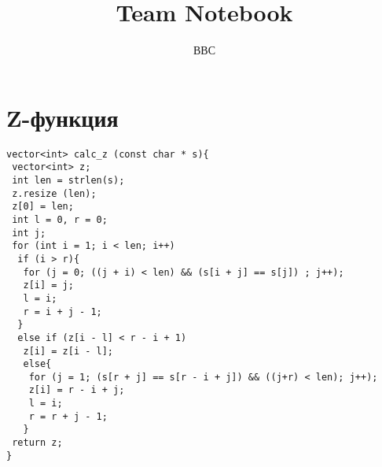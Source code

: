 \documentclass{article}
\title{Team Notebook}
\author{ВВС}
\date{}
\begin{document}
\maketitle
\section{Z-функция}
\lstset{language=C++}
\begin{lstlisting}
vector<int> calc_z (const char * s){
 vector<int> z;
 int len = strlen(s);
 z.resize (len);
 z[0] = len;
 int l = 0, r = 0;
 int j;
 for (int i = 1; i < len; i++)
  if (i > r){
   for (j = 0; ((j + i) < len) && (s[i + j] == s[j]) ; j++);
   z[i] = j;
   l = i;
   r = i + j - 1;
  }
  else if (z[i - l] < r - i + 1)
   z[i] = z[i - l];
   else{
    for (j = 1; (s[r + j] == s[r - i + j]) && ((j+r) < len); j++);
    z[i] = r - i + j;
    l = i;
    r = r + j - 1;
   }
 return z;
}
\end{lstlisting}
\end{document}
